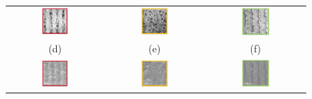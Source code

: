 \begin{figure}[htb]
\begin{tabular}{ccc}
 \includegraphics[width=0.30\textwidth]{Bilder/TS4048/aSLELOcl2.png} &   \includegraphics[width=0.30\textwidth]{Bilder/TS4048/bSLELOcl2.png} & \includegraphics[width=0.30\textwidth]{Bilder/TS4048/cSLELOcl2.png}  \\
(d)  & (e) & (f)   \\[6pt]
\includegraphics[width=0.30\textwidth]{Bilder/TS4048/aSLELOcl1.png} & \includegraphics[width=0.30\textwidth]{Bilder/TS4048/bSLELOcl1.png}  & \includegraphics[width=0.30\textwidth]{Bilder/TS4048/cSLELOcl1.png} \\

\end{tabular}
\end{figure}
